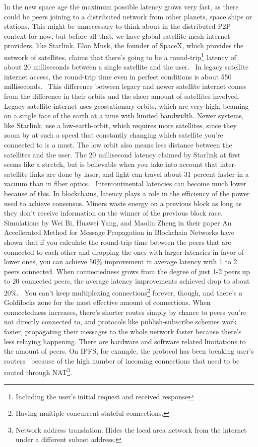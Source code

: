 In the new space age the maximum possible latency grows very fast, as there could be peers joining to a distributed network from other planets, space ships or stations. This might be unnecessary to think about in the distributed P2P context for now, but before all that, we have global satellite mesh internet providers, like Starlink. Elon Musk, the founder of SpaceX, which provides the network of satellites, claims that there's going to be a round-trip\footnote{Including the user's initial request and received response} latency of about 20 milliseconds between a single satellite and the user.~\cite{Tung_undated-ny} In legacy satellite internet access, the round-trip time even in perfect conditions is about 550 milliseconds.~\cite{noauthor_undated-zc} This difference between legacy and newer satellite internet comes from the difference in their orbits and the sheer amount of satellites involved. Legacy satellite internet uses geostationary orbits, which are very high, beaming on a single face of the earth at a time with limited bandwidth. Newer systems, like Starlink, use a low-earth-orbit, which requires more satellites, since they zoom by at such a speed that constantly changing which satellite you're connected to is a must. The low orbit also means less distance between the satellites and the user. The 20 millisecond latency claimed by Starlink at first seems like a stretch, but is believable when you take into account that inter-satellite links are done by laser, and light can travel about 31 percent faster in a vacuum than in fiber optics.~\cite{Finley2013-wt} Intercontinental latencies can become much lower because of this.
In blockchains, latency plays a role in the efficiency of the power used to achieve consensus. Miners waste energy on a previous block as long as they don't receive information on the winner of the previous block race. Simulations by Wei Bi, Huawei Yang, and Maolin Zheng in their paper An Accellerated Method for Message Propagation in Blockchain Networks have shown that if you calculate the round-trip time between the peers that are connected to each other and dropping the ones with larger latencies in favor of lower ones, you can achieve 50\% improvement in average latency with 1 to 2 peers connected. When connectedness grows from the degree of just 1-2 peers up to 20 connected peers, the average latency improvements achieved drop to about 20\%.~\cite{Bi_undated-is} You can't keep multiplexing connections\footnote{Having multiple concurrent stateful connections.} forever, though, and there's a Goldilocks zone for the most effective amount of connections. When connectedness increases, there's shorter routes simply by chance to peers you're not directly connected to, and protocols like publish-subscribe schemes work faster, propagating their messages to the whole network faster because there's less relaying happening. There are hardware and software related limitations to the amount of peers. On IPFS, for example, the protocol has been breaking user's routers~\cite{Whyrusleeping2016-ej} because of the high number of incoming connections that need to be routed through NAT\footnote{Network address translation. Hides the local area network from the internet under a different subnet address.}.


